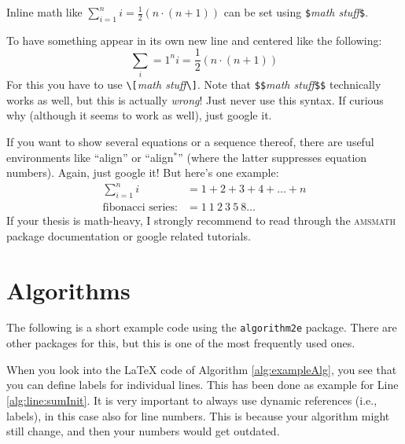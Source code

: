 \begin{compactitem}
  \item Inline math like $\sum\limits_{i=1}^n i=\frac{1}{2}(n\cdot (n+1))$ can be set using \verb!$!\emph{math stuff}\verb!$!.
  \item To have something appear in its own new line and centered like the following:
  \[\sum\limits_i=1^n i=\frac{1}{2}(n\cdot (n+1))\]
  For this you have to use \verb!\[!\emph{math stuff}\verb!\]!. Note that \verb!$$!\emph{math stuff}\verb!$$! technically works as well, but this is actually \emph{wrong}! Just never use this syntax. If curious why (although it seems to work as well), just google it.
  \item If you want to show several equations or a sequence thereof, there are useful environments like ``align'' or ``align$^*$'' (where the latter suppresses equation numbers). Again, just google it! But here's one example:
  \begin{align}
    \sum\limits_{i=1}^n i &= 1+2+3+4+\dots+n\\
    \text{fibonacci series:}   &= 1\ 1\ 2\ 3\ 5\ 8 \dots
  \end{align}
  If your thesis is math-heavy, I strongly recommend to read through the \textsc{amsmath} package documentation or google related tutorials.
\end{compactitem}



\section{Algorithms}

The following is a short example code using the \verb!algorithm2e! package. There are other packages for this, but this is one of the most frequently used ones.

\begin{algorithm}[H]
  \DontPrintSemicolon  %
  \caption{Example algorithm using algorithm2e \label{alg:exampleAlg}}
\end{algorithm}

When you look into the \LaTeX{} code of Algorithm \ref{alg:exampleAlg}, you see that you can define labels for individual lines. This has been done as example for Line \ref{alg:line:sumInit}. It is very important to always use dynamic references (i.e., labels), in this case also for line numbers. This is because your algorithm might still change, and then your numbers would get outdated.



